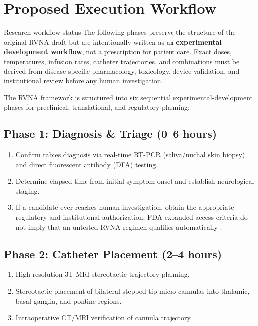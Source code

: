 \documentclass[12pt,a4paper]{article}
\begin{document}
\section{Proposed Execution Workflow}

\begin{cautionbox}{Research-workflow status}
The following phases preserve the structure of the original RVNA draft but are intentionally written as an \textbf{experimental development workflow}, not a prescription for patient care. Exact doses, temperatures, infusion rates, catheter trajectories, and combinations must be derived from disease-specific pharmacology, toxicology, device validation, and institutional review before any human investigation.
\end{cautionbox}


The RVNA framework is structured into six sequential experimental-development phases for preclinical, translational, and regulatory planning:

\subsection{Phase 1: Diagnosis \& Triage (0--6 hours)}
\begin{enumerate}
    \item Confirm rabies diagnosis via real-time RT-PCR (saliva/nuchal skin biopsy) and direct fluorescent antibody (DFA) testing.
    \item Determine elapsed time from initial symptom onset and establish neurological staging.
    \item If a candidate ever reaches human investigation, obtain the appropriate regulatory and institutional authorization; FDA expanded-access criteria do not imply that an untested RVNA regimen qualifies automatically \citep{fda2026expanded}.
\end{enumerate}

\subsection{Phase 2: Catheter Placement (2--4 hours)}
\begin{enumerate}
    \item High-resolution 3T MRI stereotactic trajectory planning.
    \item Stereotactic placement of bilateral stepped-tip micro-cannulas into thalamic, basal ganglia, and pontine regions.
    \item Intraoperative CT/MRI verification of cannula trajectory.
\end{enumerate}
\end{document}
